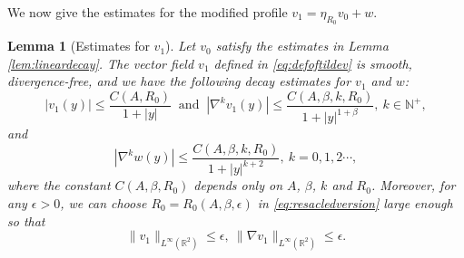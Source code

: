 \documentclass[12pt]{amsart}
\numberwithin{equation}{section}              %
\newtheorem{lemma}{Lemma}[section]
\theoremstyle{remark}
\begin{document}
		
		We now give the estimates for the modified   profile 	$v_1= \eta_{R_0}	 v_0 +w$.
		\begin{lemma}[Estimates for $  v_1$]\label{lem:Estimates for modified linear part}
			Let $v_0$ satisfy the estimates in Lemma \ref{lem:lineardecay}.
			The vector field $v_1$ defined in \eqref{eq:defoftildev} is smooth, divergence-free, and
			we have the following decay estimates for $v_1$ and $w$:
			\begin{equation}\label{eq:estv1}
			|   v_1(y)|\leq \frac{C(A,R_0)}{1+|y|} ~\textrm{ and }~	|  \nabla^k v_1(y)|\leq \frac{C(A,\beta,k, R_0)}{1+|y|^{1+\beta}}, ~k\in\mathbb{N}^+, 
			\end{equation}
			and 
			\begin{equation}\label{eq:estw}
				|  \nabla^k w(y)|\leq \frac{C(A,\beta, k, R_0)}{1+|y|^{k+2}}, ~ k=0,1,2\cdots,
			\end{equation}
			where the constant $C(A,\beta, R_0)$ depends only on $A$, $\beta$, $k$ and $R_0$.
			Moreover, for any $\epsilon>0$, we can choose $R_0=R_0(A,\beta, \epsilon)$ in \eqref{eq:resacledversion} large enough so that 
			\begin{equation}\label{eq:smallness}
				\|  v_1\|_{L^{\infty}(\mathbb{R}^2)}\leq \epsilon, ~ \|\nabla   v_1\|_{L^{\infty}(\mathbb{R}^2)} \leq \epsilon.
			\end{equation}
		\end{lemma}
\end{document}
